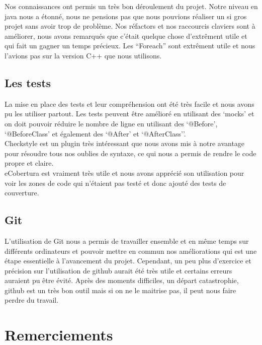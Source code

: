 \documentclass[12pt]{article}
\begin{document}
Nos connaissances ont permis un très bon déroulement du projet. Notre niveau en java nous a étonné, nous ne pensions pas que nous pouvions réaliser un si gros projet sans avoir trop de problème. Nos réfactors et nos raccourcis claviers sont à améliorer, nous avons remarqués que c'était quelque chose d'extrêment utile et qui fait un gagner un temps précieux. Les ``Foreach'' sont extrêment utile et nous l'avions pas sur la version C++ que nous utilisons. 

\subsection{Les tests}

La mise en place des tests et leur compréhension ont été très facile et nous avons pu les utiliser partout. Les tests peuvent être amélioré en utilisant des `mocks'  et on doit pouvoir réduire le nombre de ligne en utilisant des `@Before', `@BeforeClass' et également des `@After' et `@AfterClass''.\\
Checkstyle est un plugin très intéressant que nous avons mis à notre avantage pour résoudre tous nos oublies de syntaxe, ce qui nous a permis de rendre le code propre et claire.\\
eCobertura est vraiment très utile et nous avons apprécié son utilisation pour voir les zones de code qui n'étaient pas testé et donc ajouté des tests de couverture.

\subsection{Git}

L'utilisation de Git nous a permis de travailler ensemble et en même temps sur différents ordinateurs et pouvoir mettre en commun nos améliorations qui est une étape essentielle à l'avancement du projet. Cependant, un peu plus d'exercice et précision sur l'utilisation de github aurait été très utile et certains erreurs auraient pu être évité. Après des moments difficiles, un départ catastrophie, github est un très bon outil mais si on ne le maitrise pas, il peut nous faire perdre du travail.

\newpage
\section{Remerciements}
\end{document}

